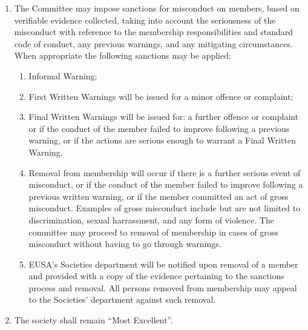 \begin{enumerate}
\item The Committee may impose sanctions for misconduct on members, based on verifiable evidence collected, taking into account the seriousness of the misconduct with reference to the membership responsibilities and standard code of conduct, any previous warnings, and any mitigating circumstances. When appropriate the following sanctions may be applied:
  \begin{enumerate}
  \item Informal Warning;
  \item First Written Warnings will be issued for a minor offence or complaint;
  \item Final Written Warnings will be issued for: a further offence or complaint or if the conduct of the member failed to improve following a previous warning, or if the actions are serious enough to warrant a Final Written Warning.
  \item Removal from membership will occur if there is a further serious event of misconduct, or if the conduct of the member failed to improve following a previous written warning, or if the member committed an act of gross misconduct. Examples of gross misconduct include but are not limited to discrimination, sexual harrassment, and any form of violence. The committee may proceed to removal of membership in cases of gross misconduct without having to go through warnings.
  \item EUSA's Societies department will be notified upon removal of a member and provided with a copy of the evidence pertaining to the sanctions process and removal. All persons removed from membership may appeal to the Societies' department against such removal.
  \end{enumerate}

\item The society shall remain \enquote{Most Excellent}.

\end{enumerate}

